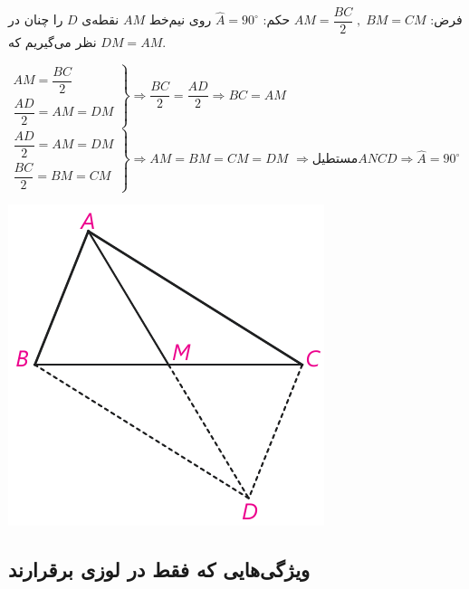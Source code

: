 \documentclass[12pt, a4paper, twoside]{book}
\begin{document}
  \begin{minipage}{.65\textwidth}
 	\centering فرض: 
 	$
 	 AM = \dfrac{BC}{2} \; , \; BM = CM
 	$
 	\qquad حکم:
 	$ 
 	\widehat{A} = 90^{\circ}
 	$
 	\newline
 	روی نیم‌خط $AM$ نقطه‌ی $D$ را چنان در نظر می‌گیریم که $DM = AM$.
 	\begin{flushleft}
 		$ 
	 		\left. 
		 		\begin{array}{crr}
		 			AM = \dfrac{BC}{2} \\
		 			\dfrac{AD}{2} = AM = DM
		 		\end{array}
	 		\right\}
	 		\Rightarrow \dfrac{BC}{2} = \dfrac{AD}{2} \Rightarrow BC =AM 
 		$
 		$
			\left. 
	 			\begin{array}{crr}
	 				\dfrac{AD}{2} =  AM = DM\\
	 				\dfrac{BC}{2} = BM = CM
	 			\end{array}
			\right\}
 			\Rightarrow AM = BM = CM = DM
 		$
 		$
 			\Rightarrow \mbox{مستطیل‌} ANCD \Rightarrow \widehat{A} = 90^{\circ}
 		$
 		
 	\end{flushleft}
 \end{minipage}
 \begin{minipage}{.34\textwidth}
 	\begin{flushleft}
 		\includegraphics{"Shapes/Fasl - 3/Dars 1/2-2.2.pdf"}
 	\end{flushleft}
 \end{minipage}
 

\subsection{ویژگی‌هایی که فقط در لوزی برقرارند}
\end{document}
